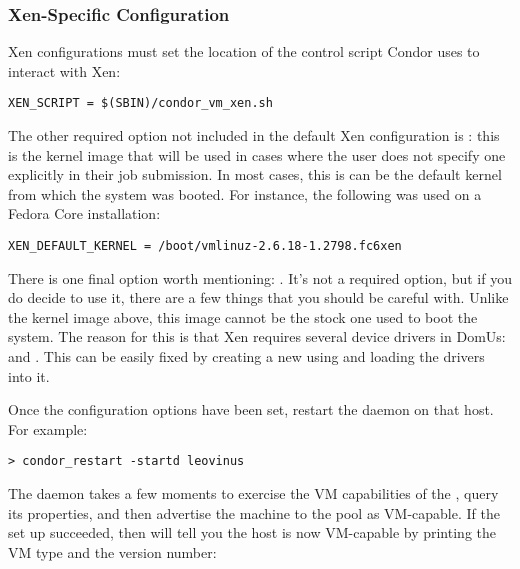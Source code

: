 \subsubsection{Xen-Specific Configuration}

Xen configurations must set the location of the control script Condor
uses to interact with Xen:

\begin{verbatim}
XEN_SCRIPT = $(SBIN)/condor_vm_xen.sh
\end{verbatim}

The other required option not included in the default Xen configuration is
: this is the kernel image that will be used
in cases where the user does not specify one explicitly in their job
submission.  In most cases, this is can be the default kernel from which
the system was booted.  For instance, the following was used on a Fedora
Core installation:

\begin{verbatim}
XEN_DEFAULT_KERNEL = /boot/vmlinuz-2.6.18-1.2798.fc6xen
\end{verbatim}

There is one final option worth mentioning: .  
It's not a required option, but if you do decide to use it, there are a 
few things that you should be careful with.  Unlike the kernel image above,
this image cannot be the stock one used to boot the system.  The reason
for this is that Xen requires several device drivers in DomUs:  
and .  This can be easily fixed by creating a new 
using  and loading the drivers into it.


Once the configuration options have been set, restart the  
daemon on that host.  For example:

\begin{verbatim}
> condor_restart -startd leovinus
\end{verbatim}

The  daemon takes a few moments to exercise the VM
capabilities of the , query its properties, and then 
advertise the machine to the pool as VM-capable.  If the set up 
succeeded, then  will tell you the host is now 
VM-capable by printing the VM type and the version number:


